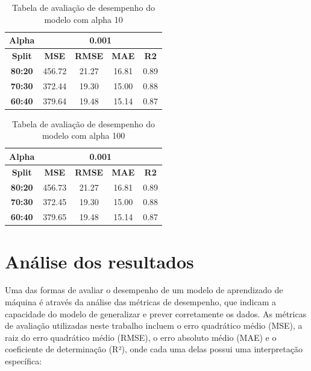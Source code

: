 \begin{table}[H]
\centering
\begin{tabular}{|c|c|c|c|c|}
\hline
\textbf{Alpha} & \multicolumn{4}{|c|}{\textbf{0.001}} \\
\hline
\textbf{Split} & \textbf{MSE} & \textbf{RMSE} & \textbf{MAE} & \textbf{R2} \\
\hline
\textbf{80:20} & 456.72 & 21.27 & 16.81 & 0.89 \\
\textbf{70:30} & 372.44 & 19.30 & 15.00 & 0.88 \\
\textbf{60:40} & 379.64 & 19.48 & 15.14 & 0.87 \\
\hline
\end{tabular}
\caption{Tabela de avaliação de desempenho do modelo com alpha 10}
\end{table}

\begin{table}[H]
\centering
\begin{tabular}{|c|c|c|c|c|}
\hline
\textbf{Alpha} & \multicolumn{4}{|c|}{\textbf{0.001}} \\
\hline
\textbf{Split} & \textbf{MSE} & \textbf{RMSE} & \textbf{MAE} & \textbf{R2} \\
\hline
\textbf{80:20} & 456.73 & 21.27 & 16.81 & 0.89 \\
\textbf{70:30} & 372.45 & 19.30 & 15.00 & 0.88 \\
\textbf{60:40} & 379.65 & 19.48 & 15.14 & 0.87 \\
\hline
\end{tabular}
\caption{Tabela de avaliação de desempenho do modelo com alpha 100}
\end{table}


\section{Análise dos resultados}

Uma das formas de avaliar o desempenho de um modelo de aprendizado de máquina é através da análise das métricas de desempenho, que indicam a capacidade do modelo de generalizar e prever corretamente os dados. As métricas de avaliação utilizadas neste trabalho incluem o erro quadrático médio (MSE), a raiz do erro quadrático médio (RMSE), o erro absoluto médio (MAE) e o coeficiente de determinação (R²), onde cada uma delas possui uma interpretação específica:

